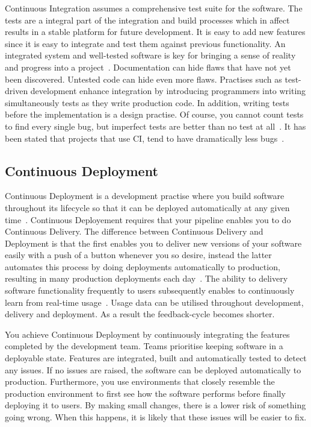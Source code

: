 \documentclass[english]{tktltiki2}
\begin{document}
Continuous Integration assumes a comprehensive test suite for the software. The tests are a integral part of the integration and build processes which in affect results in a stable platform for future development. It is easy to add new features since it is easy to integrate and test them against previous functionality. An integrated system and well-tested software is key for bringing a sense of reality and progress into a project~\cite{Fow05}. Documentation can hide flaws that have not yet been discovered. Untested code can hide even more flaws. Practises such as test-driven development enhance integration by introducing programmers into writing simultaneously tests as they write production code. In addition, writing tests before the implementation is a design practise. Of course, you cannot count tests to find every single bug, but imperfect tests are better than no test at all~\cite{Fow06}. It has been stated that projects that use CI, tend to have dramatically less bugs~\cite{Fow06}.

\subsection{Continuous Deployment}

Continuous Deployment is a development practise where you build software throughout its lifecycle so that it can be deployed automatically at any given time~\cite{Fow13a}. Continuous Deployement requires that your pipeline enables you to do Continuous Delivery. The difference between Continuous Delivery and Deployment is that the first enables you to deliver new versions of your software easily with a push of a button whenever you so desire, instead the latter automates this process by doing deployments automatically to production, resulting in many production deployments each day~\cite{OR11, Sny13, Rub14}. The ability to delivery software functionality frequently to users subsequently enables to continuously learn from real-time usage~\cite{HAB12}. Usage data can be utilised throughout development, delivery and deployment. As a result the feedback-cycle becomes shorter.

You achieve Continuous Deployment by continuously integrating the features completed by the development team. Teams prioritise keeping software in a deployable state. Features are integrated, built and automatically tested to detect any issues. If no issues are raised, the software can be deployed automatically to production. Furthermore, you use environments that closely resemble the production environment to first see how the software performs before finally deploying it to users. By making small changes, there is a lower risk of something going wrong. When this happens, it is likely that these issues will be easier to fix.
\end{document}
